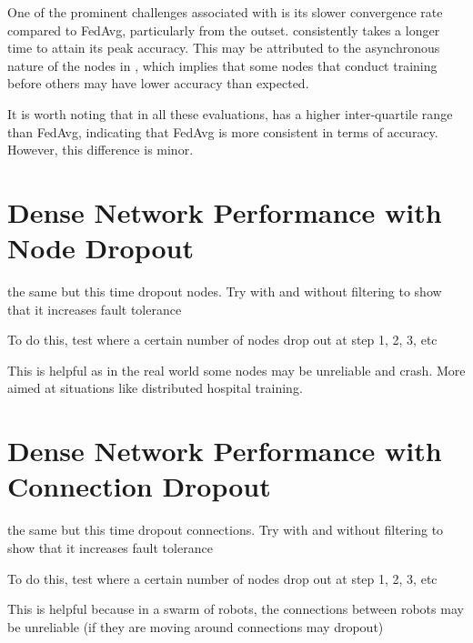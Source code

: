 One of the prominent challenges associated with \SL is its slower convergence rate compared to FedAvg, particularly from the outset. \SL consistently takes a longer time to attain its peak accuracy. This may be attributed to the asynchronous nature of the nodes in \SL, which implies that some nodes that conduct training before others may have lower accuracy than expected.

It is worth noting that in all these evaluations, \SL has a higher inter-quartile range than FedAvg, indicating that FedAvg is more consistent in terms of accuracy. However, this difference is minor.


\section{Dense Network Performance with Node Dropout}


the same but this time dropout nodes. Try with and without filtering to show that it increases fault tolerance

To do this, test where a certain number of nodes drop out at step 1, 2, 3, etc

This is helpful as in the real world some nodes may be unreliable and crash. More aimed at situations like distributed hospital training.

\section{Dense Network Performance with Connection Dropout}


the same but this time dropout connections. Try with and without filtering to show that it increases fault tolerance

To do this, test where a certain number of nodes drop out at step 1, 2, 3, etc

This is helpful because in a swarm of robots, the connections between robots may be unreliable (if they are moving around connections may dropout)

